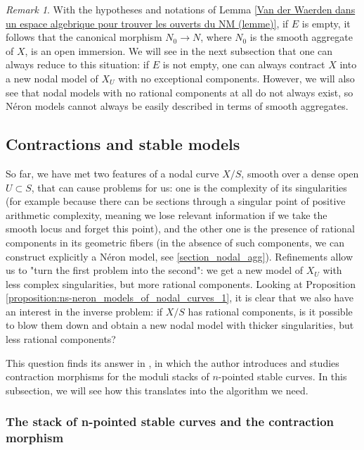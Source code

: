 \documentclass[a4paper,10pt,twoside]{article}
\theoremstyle{definition}
\theoremstyle{remark}
\newtheorem{rem}{Remark}[thm]
\begin{document}
\begin{rem}
With the hypotheses and notations of Lemma \ref{Van der Waerden dans un espace algebrique pour trouver les ouverts du NM (lemme)}, if $E$ is empty, it follows that the canonical morphism $N_0\to N$, where $N_0$ is the smooth aggregate of $X$, is an open immersion. We will see in the next subsection that one can always reduce to this situation: if $E$ is not empty, one can always contract $X$ into a new nodal model of $X_U$ with no exceptional components. However, we will also see that nodal models with no rational components at all do not always exist, so N\'eron models cannot always be easily described in terms of smooth aggregates.
\end{rem}

\subsection{Contractions and stable models}

So far, we have met two features of a nodal curve $X/S$, smooth over a dense open $U\subset S$, that can cause problems for us: one is the complexity of its singularities (for example because there can be sections through a singular point of positive arithmetic complexity, meaning we lose relevant information if we take the smooth locus and forget this point), and the other one is the presence of rational components in its geometric fibers (in the absence of such components, we can construct explicitly a N\'eron model, see \ref{section_nodal_agg}). Refinements allow us to "turn the first problem into the second": we get a new model of $X_U$ with less complex singularities, but more rational components. Looking at Proposition \ref{proposition:ns-neron_models_of_nodal_curves_1}, it is clear that we also have an interest in the inverse problem: if $X/S$ has rational components, is it possible to blow them down and obtain a new nodal model with thicker singularities, but less rational components?

This question finds its answer in \cite{Knudsen}, in which the author introduces and studies contraction morphisms for the moduli stacks of $n$-pointed stable curves. In this subsection, we will see how this translates into the algorithm we need.

\subsubsection{The stack of n-pointed stable curves and the contraction morphism}
\end{document}
